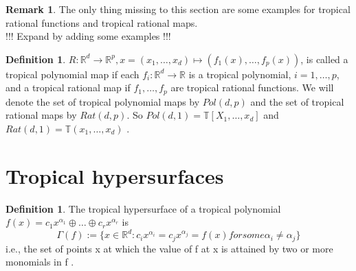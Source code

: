 \documentclass{article}
\theoremstyle{definition}
\newtheorem{definition}[theorem]{Definition}
\newtheorem{comment}[theorem]{Comment}
\newtheorem{example}[theorem]{Remark}
\begin{document}
\begin{example}
The only thing missing to this section are some examples for tropical rational functions and tropical rational maps. \\
!!! Expand by adding some examples !!!
\end{example}

\begin{definition}
$R : \mathbb{R}^{d} \to \mathbb{R}^{p}, x = (x_1, \dots , x_d)\mapsto (f_1(x), \dots , f_p(x))$, is called a tropical polynomial map if each $f_i : \mathbb{R}^{d} \to \mathbb{R}$ is a tropical polynomial, $i = 1, \dots , p$, and a tropical rational map if $f_1, \dots , f_p$ are tropical rational functions. We will denote the set of tropical polynomial maps by $Pol(d, p)$ and the set of tropical rational maps by $Rat(d, p)$. So $Pol(d, 1) = \mathbb{T}[X_1, \dots , x_d]$ and $Rat(d, 1) = \mathbb{T}(x_1, \dots , x_d)$ \cite[p.~3]{zhang2018tropical}.
\end{definition}

\newpage

\section{Tropical hypersurfaces}

\begin{definition}
The tropical hypersurface of a tropical polynomial $f(x) = c_1 x^{\alpha_1} \oplus \dots \oplus c_r x^{\alpha_r}$ is 
$$\Gamma(f) := \{ x \in \mathbb{R}^{d} : c_i x^{\alpha_i} = c_j x^{\alpha_j} = f(x) for some \alpha_i \neq \alpha_j \}$$
i.e., the set of points x at which the value of f at x is attained by two or more monomials in f \cite[p.~3]{zhang2018tropical}.
\end{definition}

\end{document}
